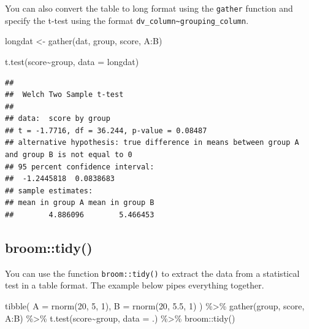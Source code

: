 \documentclass[
  oneside]{book}
\newenvironment{Shaded}{\begin{snugshade}}{\end{snugshade}}
\newcommand{\AttributeTok}[1]{\textcolor[rgb]{0.77,0.63,0.00}{#1}}
\newcommand{\DecValTok}[1]{\textcolor[rgb]{0.00,0.00,0.81}{#1}}
\newcommand{\FloatTok}[1]{\textcolor[rgb]{0.00,0.00,0.81}{#1}}
\newcommand{\FunctionTok}[1]{\textcolor[rgb]{0.00,0.00,0.00}{#1}}
\newcommand{\NormalTok}[1]{#1}
\newcommand{\OtherTok}[1]{\textcolor[rgb]{0.56,0.35,0.01}{#1}}
\newcommand{\SpecialCharTok}[1]{\textcolor[rgb]{0.00,0.00,0.00}{#1}}
\begin{document}
You can also convert the table to long format using the \texttt{gather} function and specify the t-test using the format \texttt{dv\_column\textasciitilde{}grouping\_column}.

\begin{Shaded}
\begin{Highlighting}[]
\NormalTok{longdat }\OtherTok{\textless{}{-}} \FunctionTok{gather}\NormalTok{(dat, group, score, A}\SpecialCharTok{:}\NormalTok{B)}

\FunctionTok{t.test}\NormalTok{(score}\SpecialCharTok{\textasciitilde{}}\NormalTok{group, }\AttributeTok{data =}\NormalTok{ longdat) }
\end{Highlighting}
\end{Shaded}

\begin{verbatim}
## 
##  Welch Two Sample t-test
## 
## data:  score by group
## t = -1.7716, df = 36.244, p-value = 0.08487
## alternative hypothesis: true difference in means between group A and group B is not equal to 0
## 95 percent confidence interval:
##  -1.2445818  0.0838683
## sample estimates:
## mean in group A mean in group B 
##        4.886096        5.466453
\end{verbatim}

\hypertarget{broomtidy}{%
\subsection{broom::tidy()}\label{broomtidy}}

You can use the function \texttt{broom::tidy()} to extract the data from a statistical test in a table format. The example below pipes everything together.

\begin{Shaded}
\begin{Highlighting}[]
\FunctionTok{tibble}\NormalTok{(}
  \AttributeTok{A =} \FunctionTok{rnorm}\NormalTok{(}\DecValTok{20}\NormalTok{, }\DecValTok{5}\NormalTok{, }\DecValTok{1}\NormalTok{),}
  \AttributeTok{B =} \FunctionTok{rnorm}\NormalTok{(}\DecValTok{20}\NormalTok{, }\FloatTok{5.5}\NormalTok{, }\DecValTok{1}\NormalTok{)}
\NormalTok{) }\SpecialCharTok{\%\textgreater{}\%}
  \FunctionTok{gather}\NormalTok{(group, score, A}\SpecialCharTok{:}\NormalTok{B) }\SpecialCharTok{\%\textgreater{}\%}
  \FunctionTok{t.test}\NormalTok{(score}\SpecialCharTok{\textasciitilde{}}\NormalTok{group, }\AttributeTok{data =}\NormalTok{ .) }\SpecialCharTok{\%\textgreater{}\%}
\NormalTok{  broom}\SpecialCharTok{::}\FunctionTok{tidy}\NormalTok{()}
\end{Highlighting}
\end{Shaded}
\end{document}
